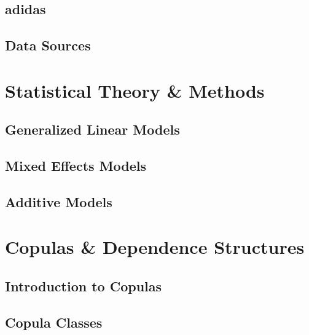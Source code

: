 \documentclass[11pt, twoside]{article}
\numberwithin{equation}{section}
\numberwithin{table}{section}
\numberwithin{figure}{section}
\begin{document}
\subsection{adidas} \label{ssec:adidas}

\subsection{Data Sources} \label{ssec:data_sources}

%
\newpage
\thispagestyle{empty}
\cleardoublepage

\thispagestyle{plain}
\section{Statistical Theory \& Methods} \label{sec:theory_and_methods}

\subsection{Generalized Linear Models} \label{ssec:glm}

\subsection{Mixed Effects Models} \label{ssec:mixed_models}

\subsection{Additive Models} \label{ssec:gam}

\newpage
\thispagestyle{empty}
\cleardoublepage

\thispagestyle{plain}
\section{Copulas \& Dependence Structures} \label{sec:copulas_and_dependence_structures}

\subsection{Introduction to Copulas} \label{ssec:intro_to_copulas}

\subsection{Copula Classes} \label{ssec:copula_classes}

\end{document}
